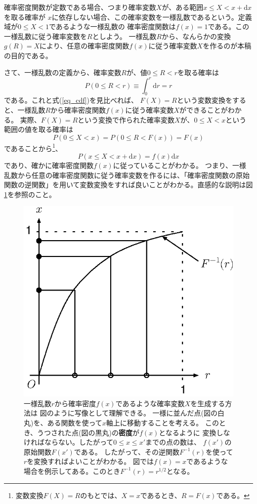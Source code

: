 \documentclass{jarticle}
\newcommand{\diff}{{\mathrm d}}
\begin{document}
確率密度関数が定数である場合、つまり確率変数$X$が、ある範囲$x \le  X < x + \diff x$を取る確率が
$x$に依存しない場合、この確率変数を一様乱数であるという。定義域が$0\le X<1$であるような一様乱数の
確率密度関数は$f(x) = 1$である。この一様乱数に従う確率変数を$R$としよう。
一様乱数$R$から、なんらかの変換$g(R) = X$により、任意の確率密度関数$f(x)$に従う確率変数$X$を作るのが本稿の目的である。

さて、一様乱数の定義から、確率変数$R$が、値$0 \le  R < r$を取る確率は
\begin{equation}
P(0 \le  R < r ) \equiv \int_0^r \diff r = r
\end{equation}
である。これと式(\ref{eq_cdf})を見比べれば、
$F(X) = R$という変数変換をすると、一様乱数$R$から確率密度関数$f(x)$に従う確率変数$X$ができることがわかる。
実際、$F(X) = R$という変換で作られた確率変数$X$が、$0  \le X < x$という範囲の値を取る確率は
\begin{equation}
P(0 \le  X < x ) = P(0 \le  R < F(x)) = F(x)
\end{equation}
であることから\footnote{変数変換$F(X) = R$のもとでは、$X=x$であるとき、$R=F(x)$である。}、
\begin{equation}
P(x \le  X < x + \diff x ) = f(x)\diff x
\end{equation}
であり、確かに確率密度関数$f(x)$に従っていることがわかる。
つまり、一様乱数から任意の確率密度関数に従う確率変数を作るには、「確率密度関数の原始関数の逆関数」を用いて変数変換をすれば良いことがわかる。直感的な説明は図\ref{fig_xrmap}を参照のこと。

\begin{figure}
\begin{center}
\includegraphics[width=.50\linewidth]{xrmap.eps}
\caption{
一様乱数$r$から確率密度$f(x)$であるような確率変数$X$を生成する方法は
図のように写像として理解できる。
一様に並んだ点(図の白丸)を、ある関数を使って$x$軸上に移動することを考える。
このとき、うつされた点(図の黒丸)の{\bf 密度}が$f(x)$となるように
変換しなければならない。したがって$0 \le x \le x'$までの点の数は、
$f(x')$の原始関数$F(x')$である。
したがって、その逆関数$F^{-1}(r)$を使って$r$を変換すればよいことがわかる。
図では$f(x) = x$であるような場合を例示してある。このとき$F^{-1}(r) = r^{1/2}$となる。
}
\label{fig_xrmap}
\end{center}

\end{figure}
\end{document}
